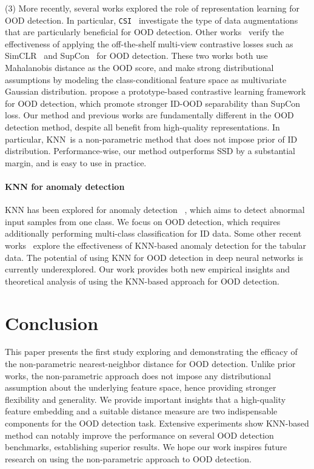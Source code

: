 \documentclass[nohyperref]{article}
\newcommand{\method}{{KNN}}
\theoremstyle{plain}
\theoremstyle{definition}
\theoremstyle{remark}
\begin{document}
\vspace{0.2cm}
(3) More recently, several works explored the role of representation learning for OOD detection. In particular, \texttt{CSI}~\citep{tack2020csi} investigate the type of data augmentations that are particularly beneficial for OOD detection. Other works~\citep{winkens2020contrastive,2021ssd} verify the effectiveness of applying the off-the-shelf multi-view contrastive losses such as {SimCLR}~\cite{chen2020simple} and {SupCon}~\cite{2020supcon} for OOD detection. These two works both use Mahalanobis distance as the OOD score, and make strong distributional assumptions by modeling the class-conditional feature space as multivariate Gaussian distribution. \citet{ming2022cider} propose a prototype-based contrastive learning framework for OOD detection, which promote stronger ID-OOD separability than SupCon loss. Our method and previous works are fundamentally different in the OOD detection method, despite all benefit from high-quality representations. In particular, \method~is a non-parametric method that does not impose prior of ID distribution. Performance-wise, our method outperforms SSD by a substantial margin, and is easy to use in practice.



\paragraph{KNN for anomaly detection} KNN has been explored for anomaly detection ~\citep{jing2014somknn, zhao2020analysis, liron2020knnanomly}, which aims to detect abnormal input samples from one class. We focus on OOD detection, which {requires additionally performing multi-class classification for ID data}. Some other recent works~\citep{dang2015knntabular, gu2019statknn, pires2020knntabular} explore the effectiveness of KNN-based anomaly detection for the tabular data. The potential of using KNN for OOD detection in deep neural networks is currently underexplored. Our work provides both new empirical insights and theoretical analysis of using the KNN-based approach for OOD detection.




\section{Conclusion}
\label{sec:concl}

This paper presents the first study exploring and demonstrating the efficacy of the non-parametric nearest-neighbor distance for OOD detection. Unlike prior works, the non-parametric approach does not impose {any} distributional assumption about the underlying feature space, hence providing stronger flexibility and generality.
We provide important insights that  
a high-quality feature embedding and a suitable distance measure are two indispensable components for the OOD detection task. Extensive experiments show  KNN-based method can notably improve the performance on several OOD detection benchmarks, establishing superior results. We hope our work inspires future research on using the non-parametric approach to OOD detection. 
\end{document}
